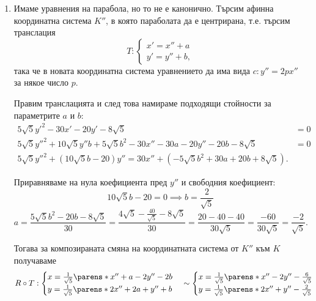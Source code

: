 \documentclass{../../common/topic}
\begin{document}
\begin{solution}
\begin{enumerate}
    \item Имаме уравнения на парабола, но то не е канонично. Търсим афинна координатна система \( K'' \), в която параболата да е центрирана, т.е. търсим транслация
    \begin{equation*}
      T: \begin{cases}
        x' = x'' + a \\
        y' = y'' + b,
      \end{cases}
    \end{equation*}
    така че в новата координатна система уравнението да има вида \( c: y'' = 2px'' \) за някое число \( p \).

    Правим транслацията и след това намираме подходящи стойности за параметрите \( a \) и \( b \):
    \begin{align*}
      5 \sqrt 5 y'^2 - 30 x' - 20 y' - 8 \sqrt 5 &= 0 \\
      5 \sqrt 5 y''^2 + 10 \sqrt 5 y'' b + 5 \sqrt 5 b^2 - 30 x'' - 30a - 20 y'' - 20b - 8 \sqrt 5 &= 0 \\
      5 \sqrt 5 y''^2 + (10 \sqrt 5 b - 20) y'' = 30 x'' + (- 5 \sqrt 5 b^2 + 30a + 20b + 8 \sqrt 5).
    \end{align*}

    Приравняваме на нула коефициента пред \( y'' \) и свободния коефициент:
    \begin{equation*}
      10 \sqrt 5 b - 20 = 0 \implies b = \frac 2 {\sqrt 5}
    \end{equation*}
    \begin{equation*}
      a
      =
      \frac {5 \sqrt 5 b^2 - 20 b - 8 \sqrt 5} {30}
      =
      \frac {4 \sqrt 5 - \frac {40} {\sqrt 5} - 8 \sqrt 5} {30}
      =
      \frac {20 - 40 - 40} {30 \sqrt 5}
      =
      \frac {-60} {30 \sqrt 5}
      =
      \frac {-2} {\sqrt 5}.
    \end{equation*}

    Тогава за композираната смяна на координатната система от \( K'' \) към \( K \) получаваме
    \begin{equation*}
      R \circ T: \begin{cases}
        x = \frac 1 {\sqrt 5} \parens*{ x'' + a - 2y'' - 2b } \\
        y = \frac 1 {\sqrt 5} \parens*{ 2x'' + 2a + y'' + b }
      \end{cases}
      \sim
      \begin{cases}
        x = \frac 1 {\sqrt 5} \parens*{ x'' - 2y'' - \frac 6 {\sqrt 5} } \\
        y = \frac 1 {\sqrt 5} \parens*{ 2x'' + y'' - \frac 2 {\sqrt 5} }
      \end{cases}
    \end{equation*}


\end{enumerate}
\end{solution}
\end{document}
